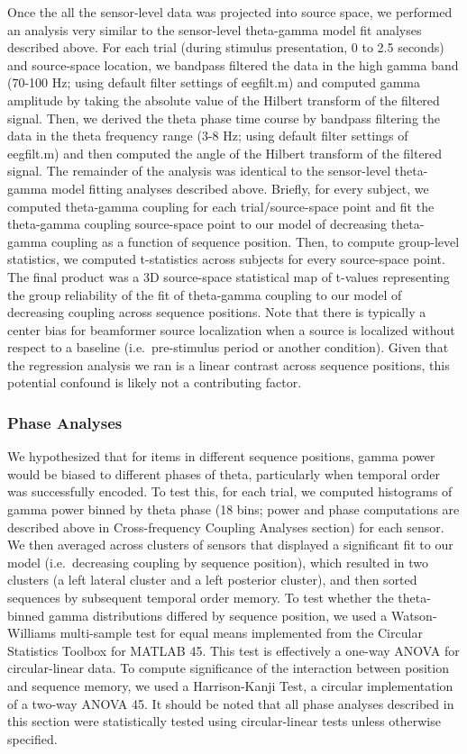Once the all the sensor-level data was projected into source space, we
performed an analysis very similar to the sensor-level theta-gamma model
fit analyses described above. For each trial (during stimulus
presentation, 0 to 2.5 seconds) and source-space location, we bandpass
filtered the data in the high gamma band (70-100 Hz; using default
filter settings of eegfilt.m) and computed gamma amplitude by taking the
absolute value of the Hilbert transform of the filtered signal. Then, we
derived the theta phase time course by bandpass filtering the data in
the theta frequency range (3-8 Hz; using default filter settings of
eegfilt.m) and then computed the angle of the Hilbert transform of the
filtered signal. The remainder of the analysis was identical to the
sensor-level theta-gamma model fitting analyses described above.
Briefly, for every subject, we computed theta-gamma coupling for each
trial/source-space point and fit the theta-gamma coupling source-space
point to our model of decreasing theta-gamma coupling as a function of
sequence position. Then, to compute group-level statistics, we computed
t-statistics across subjects for every source-space point. The final
product was a 3D source-space statistical map of t-values representing
the group reliability of the fit of theta-gamma coupling to our model of
decreasing coupling across sequence positions. Note that there is
typically a center bias for beamformer source localization when a source
is localized without respect to a baseline (i.e.~pre-stimulus period or
another condition). Given that the regression analysis we ran is a
linear contrast across sequence positions, this potential confound is
likely not a contributing factor.

\subsubsection{Phase Analyses}\label{phase-analyses}

We hypothesized that for items in different sequence positions, gamma
power would be biased to different phases of theta, particularly when
temporal order was successfully encoded. To test this, for each trial,
we computed histograms of gamma power binned by theta phase (18 bins;
power and phase computations are described above in Cross-frequency
Coupling Analyses section) for each sensor. We then averaged across
clusters of sensors that displayed a significant fit to our model
(i.e.~decreasing coupling by sequence position), which resulted in two
clusters (a left lateral cluster and a left posterior cluster), and then
sorted sequences by subsequent temporal order memory. To test whether
the theta-binned gamma distributions differed by sequence position, we
used a Watson-Williams multi-sample test for equal means implemented
from the Circular Statistics Toolbox for MATLAB 45. This test is
effectively a one-way ANOVA for circular-linear data. To compute
significance of the interaction between position and sequence memory, we
used a Harrison-Kanji Test, a circular implementation of a two-way ANOVA
45. It should be noted that all phase analyses described in this section
were statistically tested using circular-linear tests unless otherwise
specified.

